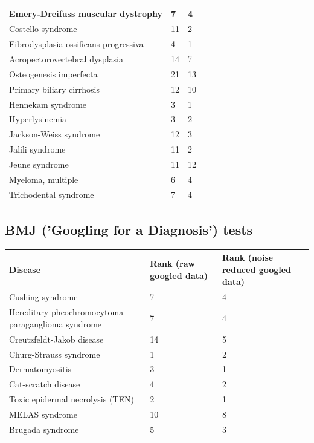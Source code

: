 \documentclass[10pt,letterpaper,final]{article}
\begin{document}
\begin{center}
\begin{small}
\begin{tabular}{|p{3.5cm}|p{1.8cm}|p{1.8cm}|}
    \hline
    Emery-Dreifuss muscular dystrophy  & 7 & 4\\
    \hline
    Costello syndrome  & 11 & 2\\
    \hline
    Fibrodysplasia ossificans progressiva  & 4 & 1\\
    \hline
    Acropectorovertebral dysplasia  & 14 & 7\\
    \hline
    Osteogenesis imperfecta  & 21 & 13\\
    \hline
    Primary biliary cirrhosis  & 12 & 10\\
    \hline
    Hennekam syndrome  & 3 & 1\\
    \hline
    Hyperlysinemia  & 3 & 2\\
    \hline
    Jackson-Weiss syndrome  & 12 & 3\\
    \hline
    Jalili syndrome & 11 & 2\\
    \hline
    Jeune syndrome & 11 & 12\\
    \hline
    Myeloma, multiple  & 6 & 4\\
    \hline
    Trichodental syndrome  & 7 & 4\\
    \hline
    \end{tabular}
\end{small}
\end{center}

\newpage
\subsection{BMJ ('Googling for a Diagnosis') tests }

\begin{center}
\begin{small}
	\begin{tabular}{|p{3.5cm}|p{1.8cm}|p{1.8cm}|}
	\hline
	\textbf{Disease}  & \textbf{Rank (raw googled data)} & \textbf{Rank (noise reduced googled data)} \\
    \hline\hline
    Cushing syndrome  & 7 &  4\\
    \hline
    Hereditary pheochromocytoma-paraganglioma syndrome  & 7 & 4\\
    \hline
    Creutzfeldt-Jakob disease  & 14 & 5\\
    \hline
    Churg-Strauss syndrome  & 1 & 2\\
    \hline
    Dermatomyositis  & 3 & 1\\
    \hline
    Cat-scratch disease  & 4 & 2\\
    \hline
    Toxic epidermal necrolysis (TEN)  & 2 & 1\\
    \hline
    MELAS syndrome  & 10 & 8\\
    \hline
    Brugada syndrome  & 5 & 3\\
    \hline
	\end{tabular}
\label{tab:results_bmj}
\end{small}
\end{center}
\end{document}
